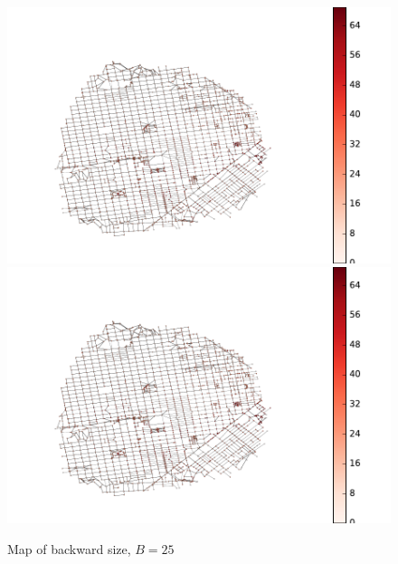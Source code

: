 \begin{figure}\label{fig:SF_hub_size_map} \caption{Map of backward size, $B=25$}
\begin{center}
\includegraphics[clip, trim=2cm 1cm 5cm 2cm,scale=0.8]{TexImg/SF_hub_sizes.pdf}
\includegraphics[clip, trim=13cm 0cm 1.1cm 0cm,scale=0.55]{TexImg/SF_hub_sizes.pdf}
\end{center}
\end{figure}